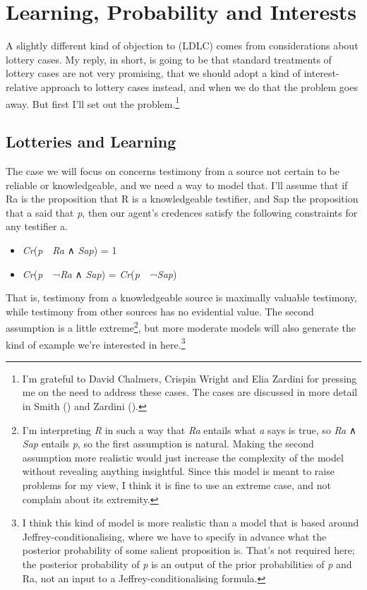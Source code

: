 \documentclass[
  10pt,
  letterpaper,
  DIV=11,
  numbers=noendperiod,
  twoside]{scrartcl}
\providecommand{\tightlist}{%
  \setlength{\itemsep}{0pt}\setlength{\parskip}{0pt}}\usepackage{longtable,booktabs,array}
\begin{document}
\section{Learning, Probability and
Interests}\label{learning-probability-and-interests}

A slightly different kind of objection to (LDLC) comes from
considerations about lottery cases. My reply, in short, is going to be
that standard treatments of lottery cases are not very promising, that
we should adopt a kind of interest-relative approach to lottery cases
instead, and when we do that the problem goes away. But first I'll set
out the problem.\footnote{I'm grateful to David Chalmers, Crispin Wright
  and Elia Zardini for pressing me on the need to address these cases.
  The cases are discussed in more detail in Smith
  () and Zardini
  ().}

\subsection{Lotteries and Learning}\label{lotteries-and-learning}

The case we will focus on concerns testimony from a source not certain
to be reliable or knowledgeable, and we need a way to model that. I'll
assume that if Ra is the proposition that R is a knowledgeable
testifier, and Sap the proposition that a said that \emph{p}, then our
agent's credences satisfy the following constraints for any testifier a.

\begin{itemize}
\tightlist
\item
  \emph{Cr}(\emph{p}~\textbar~\emph{Ra} ∧ \emph{Sap}) = 1
\item
  \emph{Cr}(\emph{p}~\textbar~¬\emph{Ra} ∧ \emph{Sap}) =
  \emph{Cr}(\emph{p}~\textbar~¬\emph{Sap})
\end{itemize}

That is, testimony from a knowledgeable source is maximally valuable
testimony, while testimony from other sources has no evidential value.
The second assumption is a little extreme\footnote{I'm interpreting
  \emph{R} in such a way that \emph{Ra} entails what \emph{a} says is
  true, so \emph{Ra} ∧ \emph{Sap} entails \emph{p}, so the first
  assumption is natural. Making the second assumption more realistic
  would just increase the complexity of the model without revealing
  anything insightful. Since this model is meant to raise problems for
  my view, I think it is fine to use an extreme case, and not complain
  about its extremity.}, but more moderate models will also generate the
kind of example we're interested in here.\footnote{I think this kind of
  model is more realistic than a model that is based around
  Jeffrey-conditionalising, where we have to specify in advance what the
  posterior probability of some salient proposition is. That's not
  required here; the posterior probability of \emph{p} is an output of
  the prior probabilities of \emph{p} and Ra, not an input to a
  Jeffrey-conditionalising formula.}
\end{document}
